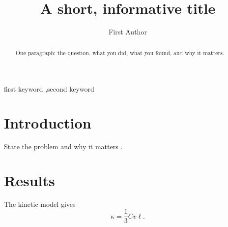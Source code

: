 \documentclass[preprint,12pt]{elsarticle}
\begin{document}
\begin{frontmatter}
\title{A short, informative title}
\author{First Author}
\address{Department of Physics, Example University, City, Country}

\begin{abstract}
One paragraph: the question, what you did, what you found, and why it matters.
\end{abstract}

\begin{keyword}
first keyword \sep second keyword
\end{keyword}
\end{frontmatter}

\section{Introduction}
State the problem and why it matters \cite{callaway1959}.

\section{Results}
The kinetic model gives
\begin{equation}
  \kappa = \frac{1}{3} C v \ell .
\end{equation}



\end{document}
